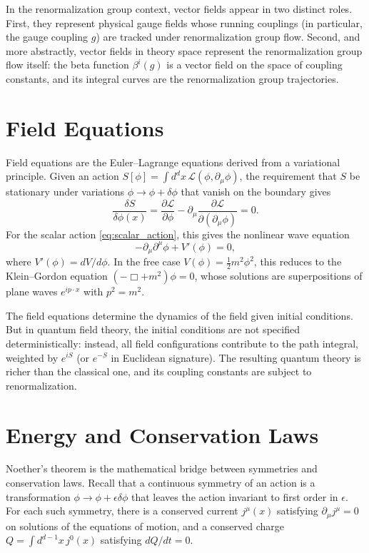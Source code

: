 \documentclass[11pt, twoside, openright]{book}
\theoremstyle{dotted}
\theoremstyle{definition}
\begin{document}
In the renormalization group context, vector fields appear in two distinct roles.
First, they represent physical gauge fields whose running couplings (in particular,
the gauge coupling $g$) are tracked under renormalization group flow. Second,
and more abstractly, vector fields in theory space represent the renormalization
group flow itself: the beta function $\beta^i(g)$ is a vector field on the
space of coupling constants, and its integral curves are the renormalization group
trajectories.

\section{Field Equations}

Field equations are the Euler--Lagrange equations derived from a variational
principle. Given an action $S[\phi] = \int d^dx \, \mathcal{L}(\phi, \partial_\mu
\phi)$, the requirement that $S$ be stationary under variations $\phi \to \phi +
\delta\phi$ that vanish on the boundary gives
\begin{equation}
  \frac{\delta S}{\delta \phi(x)}
  = \frac{\partial \mathcal{L}}{\partial \phi}
  - \partial_\mu \frac{\partial \mathcal{L}}{\partial(\partial_\mu \phi)} = 0.
  \label{eq:euler_lagrange}
\end{equation}
For the scalar action \eqref{eq:scalar_action}, this gives the nonlinear wave
equation
\begin{equation}
  -\partial_\mu\partial^\mu \phi + V'(\phi) = 0,
  \label{eq:scalar_eom}
\end{equation}
where $V'(\phi) = dV/d\phi$. In the free case $V(\phi) = \frac{1}{2}m^2\phi^2$,
this reduces to the Klein--Gordon equation $(-\Box + m^2)\phi = 0$, whose
solutions are superpositions of plane waves $e^{ip \cdot x}$ with $p^2 = m^2$.

The field equations determine the dynamics of the field given initial conditions.
But in quantum field theory, the initial conditions are not specified deterministically:
instead, all field configurations contribute to the path integral, weighted by
$e^{iS}$ (or $e^{-S}$ in Euclidean signature). The resulting quantum theory is
richer than the classical one, and its coupling constants are subject to
renormalization.

\section{Energy and Conservation Laws}

Noether's theorem is the mathematical bridge between symmetries and conservation
laws. Recall that a continuous symmetry of an action is a transformation
$\phi \to \phi + \epsilon \delta\phi$ that leaves the action invariant to first
order in $\epsilon$. For each such symmetry, there is a conserved current
$j^\mu(x)$ satisfying $\partial_\mu j^\mu = 0$ on solutions of the equations of
motion, and a conserved charge $Q = \int d^{d-1}x \, j^0(x)$ satisfying
$dQ/dt = 0$.
\end{document}
